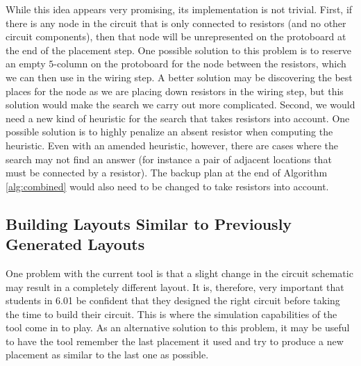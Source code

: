 While this idea appears very promising, its implementation is not trivial.
First, if there is any node in the circuit that is only
connected to resistors (and no other circuit components), then that node will be
unrepresented on the protoboard at the end of the placement step. One possible
solution to this problem is to reserve an empty $5$-column on the
protoboard for the node between the resistors, which we can then use in the
wiring step. A better solution may
be discovering the best places for the node as we are placing down resistors in
the wiring step, but this solution would make the search we carry out
more complicated. Second, we would need a new kind of heuristic for the
search that takes resistors into account. One possible solution is to highly
penalize an absent resistor when computing the heuristic.
Even with an amended heuristic, however, there
are cases where the search may not find an answer (for instance a pair of
adjacent locations that must be connected by a resistor). The backup plan at the
end of Algorithm \ref{alg:combined} would also need to be changed to take
resistors into account.

\subsection{Building Layouts Similar to Previously Generated Layouts}
One problem with the current tool is that a slight change in
the circuit schematic may result in a completely different layout. It is,
therefore, very important that students in 6.01 be confident that they designed
the right circuit before taking the time to build their circuit.
This is where the simulation
capabilities of the tool come in to play. As an alternative solution to this
problem, it may be useful to have the
tool remember the last placement it used and try to produce a new placement as
similar to the last one as possible.

